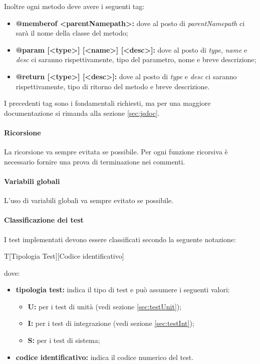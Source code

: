            		Inoltre ogni metodo deve avere i seguenti tag:
           		\begin{itemize}
           			\item \textbf{@memberof <parentNamepath>:} dove al posto di \textit{parentNamepath} ci sarà il nome della classe del metodo;
           			\item \textbf{@param [<{type}>] [<name>] [<desc>]:} dove al posto di \textit{type}, \textit{name} e \textit{desc} ci saranno rispettivamente, tipo del parametro, nome e breve descrizione;
           			\item \textbf{@return [<{type}>] [<desc>]:} dove al posto di \textit{type} e \textit{desc} ci saranno rispettivamente, tipo di ritorno del metodo e breve descrizione.
           		\end{itemize}
           		I precedenti tag sono i fondamentali richiesti, ma per una maggiore documentazione si rimanda alla sezione \ref{sec:jsdoc}.
           		            	
                \paragraph{Ricorsione}
                La ricorsione va sempre evitata se possibile. Per ogni funzione ricorsiva è necessario fornire una prova di terminazione nei commenti.
                \paragraph{Variabili globali}
                L'uso di variabili globali va sempre evitato se possibile.
				\paragraph{Classificazione dei test}
				I test implementati devono essere classificati secondo la seguente notazione:
				\begin{center}
					T[Tipologia Test][Codice identificativo]
				\end{center}
				dove:
				\begin{itemize}
					\item \textbf{tipologia test:} indica il tipo di test e può assumere i seguenti valori:
					\begin{itemize}
						\item \textbf{U:} per i test di unità (vedi sezione \ref{sec:testUnit});
						\item \textbf{I:} per i test di integrazione (vedi sezione \ref{sec:testInt});
						\item \textbf{S:} per i test di sistema;
					\end{itemize}
					\item \textbf{codice identificativo:} indica il codice numerico del test.
				\end{itemize}
